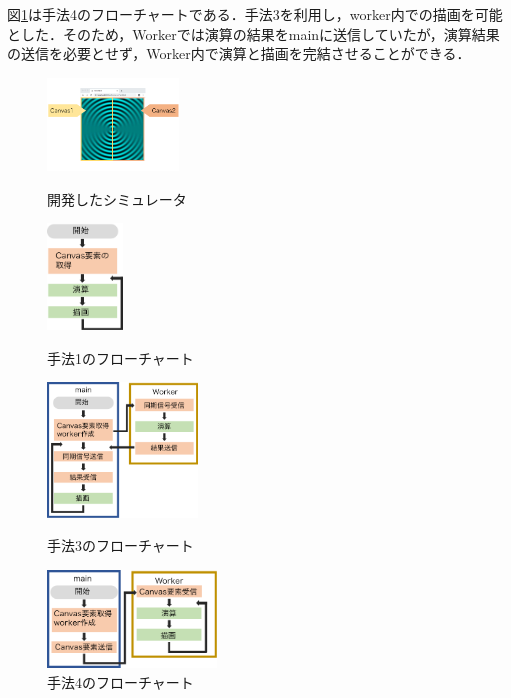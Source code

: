 \documentclass[twocolumn,10pt,a4j]{jsarticle}
\begin{document}
図\ref{fig:offsc}は手法4のフローチャートである．手法3を利用し，worker内での描画を可能とした．そのため，Workerでは演算の結果をmainに送信していたが，演算結果の送信を必要とせず，Worker内で演算と描画を完結させることができる．

\begin{figure}[htbp]
\begin{minipage}{0.49\hsize}
  \centering
   \includegraphics[width=35mm , angle=-90]{sim.pdf}
   \vspace{-10pt}
  \caption{開発したシミュレータ}
  \label{fig:sim}
 \end{minipage}
 \begin{minipage}{0.49\hsize}
  \centering
   \includegraphics[width=20mm]{cpu_chart.pdf}
   \vspace{10pt}
  \caption{手法1のフローチャート}
  \label{fig:cpu}
 \end{minipage}
 
 \begin{minipage}{0.5\hsize}
 \centering
  \vspace{5pt}	
  \includegraphics[width=40mm]{worker_chart.pdf}
     \belowcaptionskip=25pt
  \abovecaptionskip=5pt
  \caption{手法3のフローチャート}
  \label{fig:worker}
 \end{minipage}
 \begin{minipage}{0.5\hsize}
 \centering
 \vspace{-30pt}	
  \includegraphics[width=45mm  ]{offscreen_chart.pdf}
  \abovecaptionskip=30pt
  \belowcaptionskip=-10pt
  \caption{手法4のフローチャート}
  \label{fig:offsc}
 \end{minipage}
\end{figure}
\end{document}
